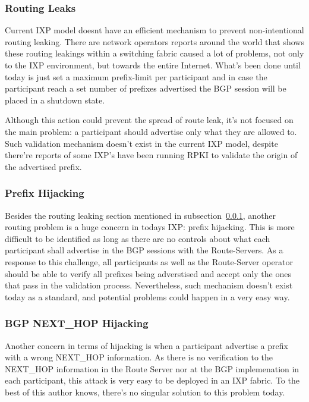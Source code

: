 \subsubsection{Routing Leaks}
\label{subsub:routingleak}
Current IXP model doesnt have an efficient mechanism to prevent non-intentional routing leaking. There are network operators reports around the world that shows these routing leakings within a switching fabric caused a lot of problems, not only to the IXP environment, but towards the entire Internet. What's been done until today is just set a maximum prefix-limit per participant and in case the participant reach a set number of prefixes advertised the BGP session will be placed in a shutdown state.

Although this action could prevent the spread of route leak, it's not focused on the main problem: a participant should advertise only what they are allowed to. Such validation mechanism doesn't exist in the current IXP model, despite there're reports of some IXP's have been running RPKI to validate the origin of the advertised prefix.

\subsubsection{Prefix Hijacking}
Besides the routing leaking section mentioned in subsection~\ref{subsub:routingleak}, another routing problem is a huge concern in todays IXP: prefix hijacking. This is more difficult to be identified as long as there are no controls about what each participant shall advertise in the BGP sessions with the Route-Servers. As a response to this challenge, all participants as well as the Route-Server operator should be able to verify all prefixes being adverstised and accept only the ones that pass in the validation process. Nevertheless, such mechanism doesn't exist today as a standard, and potential problems could happen in a very easy way.

\subsubsection{BGP NEXT\_HOP Hijacking}
Another concern in terms of hijacking is when a participant advertise a prefix with a wrong NEXT\_HOP information. As there is no verification to the NEXT\_HOP information in the Route Server nor at the BGP implemenation in each participant, this attack is very easy to be deployed in an IXP fabric. To the best of this author knows, there's no singular solution to this problem today.

